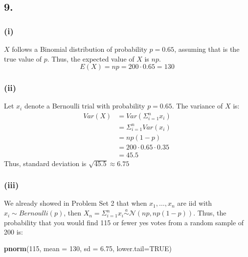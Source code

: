 \documentclass[
]{article}
\newenvironment{Shaded}{\begin{snugshade}}{\end{snugshade}}
\newcommand{\DataTypeTok}[1]{\textcolor[rgb]{0.13,0.29,0.53}{#1}}
\newcommand{\DecValTok}[1]{\textcolor[rgb]{0.00,0.00,0.81}{#1}}
\newcommand{\FloatTok}[1]{\textcolor[rgb]{0.00,0.00,0.81}{#1}}
\newcommand{\KeywordTok}[1]{\textcolor[rgb]{0.13,0.29,0.53}{\textbf{#1}}}
\newcommand{\NormalTok}[1]{#1}
\newcommand{\OtherTok}[1]{\textcolor[rgb]{0.56,0.35,0.01}{#1}}
\begin{document}
\hypertarget{section-1}{%
\subsection{9.}\label{section-1}}

\hypertarget{i-1}{%
\subsubsection{(i)}\label{i-1}}

\(X\) follows a Binomial distribution of probability \(p = 0.65\),
assuming that is the true value of \(p\). Thus, the expected value of
\(X\) is \(np\). \[E(X) = np = 200 \cdot 0.65 = 130\]

\hypertarget{ii-1}{%
\subsubsection{(ii)}\label{ii-1}}

Let \(x_i\) denote a Bernoulli trial with probability \(p = 0.65\). The
variance of \(X\) is: \[\begin{aligned} 
Var(X) &= Var(\Sigma_{i=1}^{n} x_i) \\
&= \Sigma_{i=1}^{n} Var(x_i) \\
&= np(1-p) \\
&= 200 \cdot 0.65 \cdot 0.35 \\
&= 45.5
\end{aligned}\] Thus, standard deviation is \(\sqrt{45.5} \approx 6.75\)

\hypertarget{iii-1}{%
\subsubsection{(iii)}\label{iii-1}}

We already showed in Problem Set 2 that when \(x_1, \dots, x_n\) are iid
with \(x_i \sim Bernoulli(p)\), then
\(X_n = \Sigma_{i=1} ^ n x_i \stackrel{a}{\sim} \mathcal{N}(np, np(1-p))\).
Thus, the probability that you would find 115 or fewer yes votes from a
random sample of 200 is:

\begin{Shaded}
\begin{Highlighting}[]
\KeywordTok{pnorm}\NormalTok{(}\DecValTok{115}\NormalTok{, }\DataTypeTok{mean =} \DecValTok{130}\NormalTok{, }\DataTypeTok{sd =} \FloatTok{6.75}\NormalTok{, }\DataTypeTok{lower.tail=}\OtherTok{TRUE}\NormalTok{)}
\end{Highlighting}
\end{Shaded}
\end{document}
